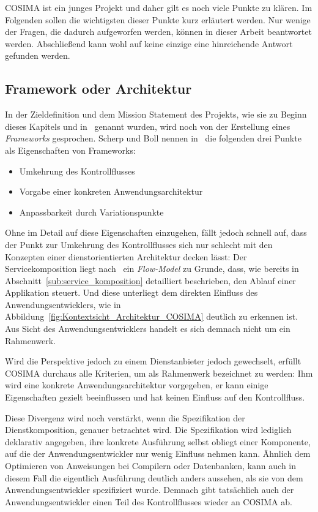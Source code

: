  COSIMA ist ein junges Projekt und daher gilt es noch viele Punkte zu klären. Im Folgenden sollen die wichtigsten dieser Punkte kurz erläutert werden. Nur wenige der Fragen, die dadurch aufgeworfen werden, können in dieser Arbeit beantwortet werden. Abschließend kann wohl auf keine einzige eine hinreichende Antwort gefunden werden.
  
\subsection{Framework oder Architektur} %
\label{sub:framework_oder_architektur}

  In der Zieldefinition und dem Mission Statement des Projekts, wie sie zu Beginn dieses Kapitels und in~\citep{bericht} genannt wurden, wird noch von der Erstellung eines \emph{Frameworks} gesprochen. Scherp und Boll nennen in~\citep[S. 396f]{scherp2006fe} die folgenden drei Punkte als Eigenschaften von Frameworks:
  
  \begin{itemize}
    \item Umkehrung des Kontrollflusses
    \item Vorgabe einer konkreten Anwendungsarchitektur
    \item Anpassbarkeit durch Variationspunkte
  \end{itemize}
  
  Ohne im Detail auf diese Eigenschaften einzugehen, fällt jedoch schnell auf, dass der Punkt zur Umkehrung des Kontrollflusses sich nur schlecht mit den Konzepten einer dienstorientierten Architektur decken lässt: Der Servicekomposition liegt nach~\citep[S. 320]{web_services_principles_and_technology} ein \emph{Flow-Model} zu Grunde, dass, wie bereits in Abschnitt~\ref{sub:service_komposition} detailliert beschrieben, den Ablauf einer Applikation steuert. Und diese unterliegt dem direkten Einfluss des Anwendungsentwicklers, wie in Abbildung~\ref{fig:Kontextsicht_Architektur_COSIMA} deutlich zu erkennen ist. Aus Sicht des Anwendungsentwicklers handelt es sich demnach nicht um ein Rahmenwerk.
  
  Wird die Perspektive jedoch zu einem Dienstanbieter jedoch gewechselt, erfüllt COSIMA durchaus alle Kriterien, um als Rahmenwerk bezeichnet zu werden: Ihm wird eine konkrete Anwendungsarchitektur vorgegeben, er kann einige Eigenschaften gezielt beeinflussen und hat keinen Einfluss auf den Kontrollfluss.
  
  Diese Divergenz wird noch verstärkt, wenn die Spezifikation der Dienstkomposition, genauer betrachtet wird. Die Spezifikation wird lediglich deklarativ angegeben, ihre konkrete Ausführung selbst obliegt einer Komponente, auf die der Anwendungsentwickler nur wenig Einfluss nehmen kann. Ähnlich dem Optimieren von Anweisungen bei Compilern oder Datenbanken, kann auch in diesem Fall die eigentlich Ausführung deutlich anders aussehen, als sie von dem Anwendungsentwickler spezifiziert wurde. Demnach gibt tatsächlich auch der Anwendungsentwickler einen Teil des Kontrollflusses wieder an COSIMA ab.
  
